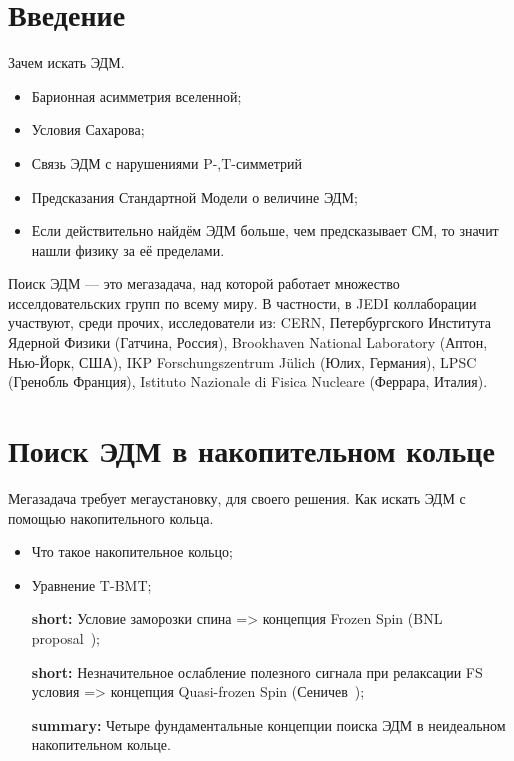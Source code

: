 \documentclass{extarticle}
\begin{document}


\tableofcontents
\pagebreak

\section*{Введение}
Зачем искать ЭДМ.
	\begin{itemize}
		\item Барионная асимметрия вселенной;
		\item Условия Сахарова;
		\item Связь ЭДМ с нарушениями P-,T-симметрий
		\item Предсказания Стандартной Модели о величине ЭДМ;
		\item Если действительно найдём ЭДМ больше, чем предсказывает СМ, то значит нашли физику за её пределами.
	\end{itemize}
Поиск ЭДМ --- это мегазадача, над которой работает множество исселдовательских групп по всему миру. В частности, в JEDI коллаборации участвуют, среди прочих, исследователи из: CERN, Петербургского Института Ядерной Физики (Гатчина, Россия), Brookhaven National Laboratory (Аптон, Нью-Йорк, США), IKP Forschungszentrum J\"ulich (Юлих, Германия), LPSC (Гренобль Франция), Istituto Nazionale di Fisica Nucleare (Феррара, Италия).~\cite{JEDI}

\section{Поиск ЭДМ в накопительном кольце}
Мегазадача требует мегаустановку, для своего решения. Как искать ЭДМ с помощью накопительного кольца.
	\begin{itemize}
		\item Что такое накопительное кольцо;
		\item Уравнение T-BMT;
		\item[\textbf{short:}] Условие заморозки спина => концепция Frozen Spin (BNL proposal~\cite{BNL});
		\item[\textbf{short:}] Незначительное ослабление полезного сигнала при релаксации FS условия => концепция Quasi-frozen Spin (Сеничев~\cite{Senichev});
		\item[\textbf{summary:}] Четыре фундаментальные концепции поиска ЭДМ в неидеальном накопительном кольце.
	\end{itemize}
	
\end{document}
